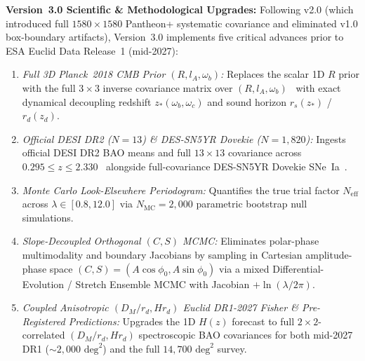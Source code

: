 \documentclass[10pt,twocolumn,a4paper]{article}
\begin{document}
\textbf{Version~3.0 Scientific \& Methodological Upgrades:} Following v2.0 (which introduced full $1580\times 1580$ Pantheon+ systematic covariance and eliminated v1.0 box-boundary artifacts), Version~3.0 implements five critical advances prior to ESA Euclid Data Release~1 (mid-2027):
\begin{enumerate}
\item \textit{Full 3D Planck~2018 CMB Prior $(R, l_A, \omega_b)$:} Replaces the scalar 1D $R$ prior with the full $3\times 3$ inverse covariance matrix over $(R, l_A, \omega_b)$~\cite{chen2019} with exact dynamical decoupling redshift $z_*(\omega_b, \omega_c)$ and sound horizon $r_s(z_*)$ / $r_d(z_d)$.
\item \textit{Official DESI DR2 ($N=13$) \& DES-SN5YR Dovekie ($N=1,820$):} Ingests official DESI DR2 BAO means and full $13\times 13$ covariance across $0.295 \le z \le 2.330$~\cite{desi2025} alongside full-covariance DES-SN5YR Dovekie SNe~Ia~\cite{des2024}.
\item \textit{Monte Carlo Look-Elsewhere Periodogram:} Quantifies the true trial factor $N_{\mathrm{eff}}$ across $\lambda \in [0.8, 12.0]$ via $N_{\mathrm{MC}} = 2,000$ parametric bootstrap null simulations.
\item \textit{Slope-Decoupled Orthogonal $(C, S)$ MCMC:} Eliminates polar-phase multimodality and boundary Jacobians by sampling in Cartesian amplitude-phase space $(C, S) = (A\cos\phi_0, A\sin\phi_0)$ via a mixed Differential-Evolution / Stretch Ensemble MCMC with Jacobian $+\ln(\lambda/2\pi)$.
\item \textit{Coupled Anisotropic $(D_M/r_d, H r_d)$ Euclid DR1-2027 Fisher \& Pre-Registered Predictions:} Upgrades the 1D $H(z)$ forecast to full $2\times 2$-correlated $(D_M/r_d, H r_d)$ spectroscopic BAO covariances for both mid-2027 DR1 ($\sim 2,000\text{ deg}^2$) and the full $14,700\text{ deg}^2$ survey.
\end{enumerate}
\end{document}
